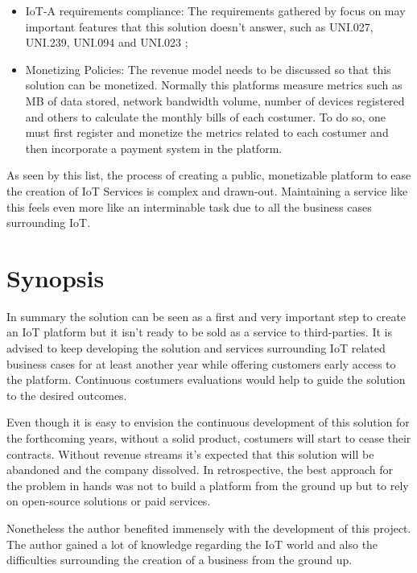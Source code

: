 \begin{itemize}
    \item IoT-A requirements compliance: The requirements gathered by \cite{iot-a} focus on may important features that this solution doesn't answer, such as UNI.027, UNI.239, UNI.094 and UNI.023 \parencite{iot-a};
    \item Monetizing Policies: The revenue model needs to be discussed so that this solution can be monetized. Normally this platforms measure metrics such as MB of data stored, network bandwidth volume, number of devices registered and others to calculate the monthly bills of each costumer. To do so, one must first register and monetize the metrics related to each costumer and then incorporate a payment system in the platform.
\end{itemize}

As seen by this list, the process of creating a public, monetizable platform to ease the creation of \gls{IoT} Services is complex and drawn-out. Maintaining a service like this feels even more like an interminable task due to all the business cases surrounding \gls{IoT}.

\section{Synopsis}
\label{sec:conclusion:synopsis}

In summary the solution can be seen as a first and very important step to create an \gls{IoT} platform but it isn't ready to be sold as a service to third-parties. It is advised to keep developing the solution and services surrounding \gls{IoT} related business cases for at least another year while offering customers early access to the platform. Continuous costumers evaluations would help to guide the solution to the desired outcomes.

Even though it is easy to envision the continuous development of this solution for the forthcoming years, without a solid product, costumers will start to cease their contracts. Without revenue streams it's expected that this solution will be abandoned and the company dissolved. In retrospective, the best approach for the problem in hands was not to build a platform from the ground up but to rely on open-source solutions or paid services.

Nonetheless the author benefited immensely with the development of this project. The author gained a lot of knowledge regarding the \gls{IoT} world and also the difficulties surrounding the creation of a business from the ground up.
